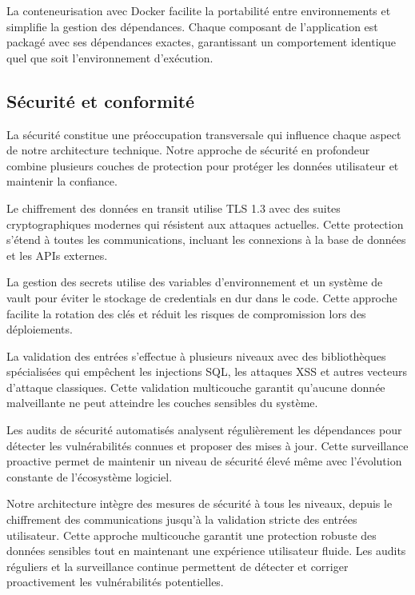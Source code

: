 La conteneurisation avec Docker facilite la portabilité entre environnements et simplifie la gestion des dépendances. Chaque composant de l'application est packagé avec ses dépendances exactes, garantissant un comportement identique quel que soit l'environnement d'exécution.

\subsection{Sécurité et conformité}

La sécurité constitue une préoccupation transversale qui influence chaque aspect de notre architecture technique. Notre approche de sécurité en profondeur combine plusieurs couches de protection pour protéger les données utilisateur et maintenir la confiance.

Le chiffrement des données en transit utilise TLS 1.3 avec des suites cryptographiques modernes qui résistent aux attaques actuelles. Cette protection s'étend à toutes les communications, incluant les connexions à la base de données et les APIs externes.

La gestion des secrets utilise des variables d'environnement et un système de vault pour éviter le stockage de credentials en dur dans le code. Cette approche facilite la rotation des clés et réduit les risques de compromission lors des déploiements.

La validation des entrées s'effectue à plusieurs niveaux avec des bibliothèques spécialisées qui empêchent les injections SQL, les attaques XSS et autres vecteurs d'attaque classiques. Cette validation multicouche garantit qu'aucune donnée malveillante ne peut atteindre les couches sensibles du système.

Les audits de sécurité automatisés analysent régulièrement les dépendances pour détecter les vulnérabilités connues et proposer des mises à jour. Cette surveillance proactive permet de maintenir un niveau de sécurité élevé même avec l'évolution constante de l'écosystème logiciel.

\begin{successbox}
Notre architecture intègre des mesures de sécurité à tous les niveaux, depuis le chiffrement des communications jusqu'à la validation stricte des entrées utilisateur. Cette approche multicouche garantit une protection robuste des données sensibles tout en maintenant une expérience utilisateur fluide. Les audits réguliers et la surveillance continue permettent de détecter et corriger proactivement les vulnérabilités potentielles.
\end{successbox}